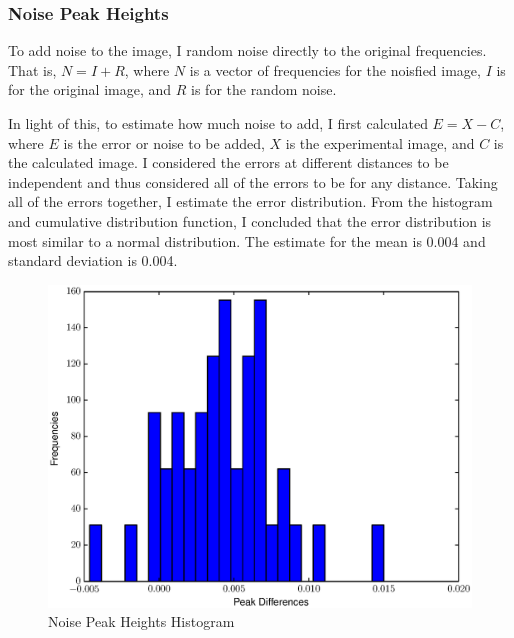 \documentclass[12pt,letterpaper]{article}
\begin{document}
\subsubsection{Noise Peak Heights}
To add noise to the image, I random noise directly to the original frequencies.
That is, $N = I + R$, where $N$ is a vector of frequencies for the noisfied
image, $I$ is for the original image, and $R$ is for the random noise.

In light of this, to estimate how much noise to add, I first calculated $E = X -
C$, where $E$ is the error or noise to be added, $X$ is the experimental image,
and $C$ is the calculated image. I considered the errors at different distances
to be independent and thus considered all of the errors to be for any distance.
Taking all of the errors together, I estimate the error distribution. From the
histogram and cumulative distribution function, I concluded that the error
distribution is most similar to a normal distribution. The estimate for the mean
is 0.004 and standard deviation is 0.004.

\begin{figure}[ht]
  \begin{center}
    \includegraphics[scale=0.8]{figs/noise_peak_dist.eps}
    \caption{Noise Peak Heights Histogram}
  \end{center}
\end{figure}
\end{document}
